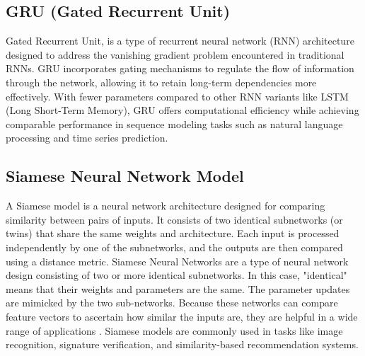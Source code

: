    

    \subsection{GRU (Gated Recurrent Unit)}
    Gated Recurrent Unit, is a type of recurrent neural network (RNN) architecture designed to address the vanishing gradient problem encountered in traditional RNNs. GRU incorporates gating mechanisms to regulate the flow of information through the network, allowing it to retain long-term dependencies more effectively. With fewer parameters compared to other RNN variants like LSTM (Long Short-Term Memory), GRU offers computational efficiency while achieving comparable performance in sequence modeling tasks such as natural language processing and time series prediction. 

     \subsection{Siamese Neural Network Model}
    A Siamese model is a neural network architecture designed for comparing similarity between pairs of inputs. It consists of two identical subnetworks (or twins) that share the same weights and architecture. Each input is processed independently by one of the subnetworks, and the outputs are then compared using a distance metric. Siamese Neural Networks are a type of neural network design consisting of two or more identical subnetworks. In this case, "identical" means that their weights and parameters are the same. The parameter updates are mimicked by the two sub-networks. Because these networks can compare feature vectors to ascertain how similar the inputs are, they are helpful in a wide range of applications . Siamese models are commonly used in tasks like image recognition, signature verification, and similarity-based recommendation systems.
   





